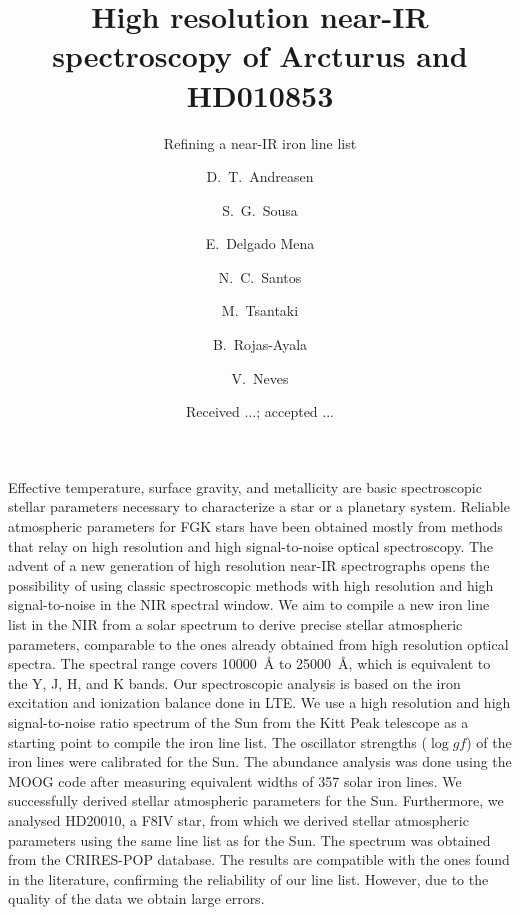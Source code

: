 \documentclass{aa}
\begin{document}
\title{High resolution near-IR spectroscopy of Arcturus and HD010853}
\subtitle{Refining a near-IR iron line list}


\author{ D.~T.~Andreasen
    \and S.~G.~Sousa
    \and E.~Delgado Mena
    \and N.~C.~Santos
    \and M.~Tsantaki
    \and B.~Rojas-Ayala
    \and V.~Neves}







\date{Received ...; accepted ...}

\abstract
{Effective temperature, surface gravity, and metallicity are basic
spectroscopic stellar parameters necessary to characterize
a star or a planetary system. Reliable atmospheric parameters for
FGK stars have been obtained mostly from methods that relay on high
resolution and high signal-to-noise optical spectroscopy. The
advent of a new generation of high resolution near-IR spectrographs
opens the possibility of using classic spectroscopic methods with
high resolution and high signal-to-noise in the NIR spectral window.}
{We aim to compile a new iron line list in the NIR from a solar
spectrum to derive precise stellar atmospheric parameters,
comparable to the ones already obtained from high resolution optical
spectra. The spectral range covers \SI{10000}{\angstrom} to
\SI{25000}{\angstrom}, which is equivalent to the Y, J, H, and K bands.}
{Our spectroscopic analysis is based on the iron excitation and
ionization balance done in LTE. We
use a high resolution and high signal-to-noise ratio spectrum of the Sun
from the Kitt Peak telescope as a starting point to compile the iron
line list. The oscillator strengths ($\log\mathit{gf}$) of the iron lines were calibrated for the Sun.
The abundance analysis was done using
the MOOG code after measuring equivalent widths of 357 solar iron lines.}
{We successfully derived stellar atmospheric parameters for the
Sun.
Furthermore, we analysed
HD20010, a F8IV star, from which we derived stellar atmospheric
parameters using the same line list as for the Sun. The spectrum
was obtained from the CRIRES-POP database.
The results are compatible with the ones found in the literature,
confirming the reliability of our line list. However, due to the
quality of the data we obtain large errors.}
{}
\end{document}
